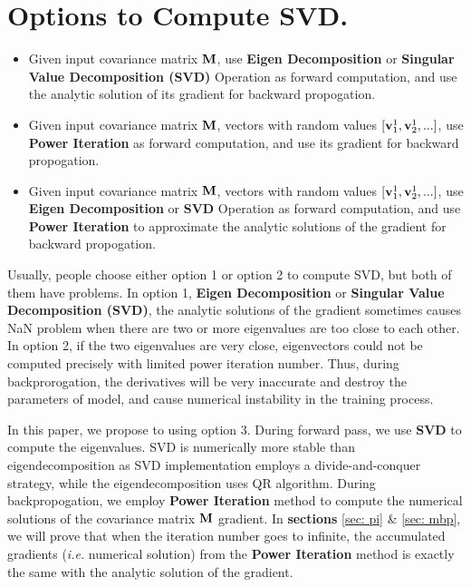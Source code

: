 \section{Options to Compute SVD.}

\begin{itemize}
\item Given input covariance matrix $\mathbf{M}$, use \textbf{Eigen Decomposition} or \textbf{Singular Value Decomposition (SVD)} Operation as forward computation, and use the analytic solution of its gradient for backward propogation.
\item Given input covariance matrix $\mathbf{M}$, vectors with random values $[\mathbf{v}_1^{1}, \mathbf{v}_2^{1}, ...]$, use \textbf{Power Iteration} as forward computation, and use its gradient for backward propogation.
\item Given input covariance matrix $\mathbf{M}$, vectors with random values $[\mathbf{v}_1^{1}, \mathbf{v}_2^{1}, ...]$, use \textbf{Eigen Decomposition} or \textbf{SVD} Operation as forward computation, and use \textbf{Power Iteration} to approximate the analytic solutions of the gradient for backward propogation.
\end{itemize}

Usually, people choose either option 1 or option 2 to compute SVD, but both of them have problems.
In option 1, \textbf{Eigen Decomposition} or \textbf{Singular Value Decomposition (SVD)}, the analytic solutions of the gradient sometimes causes NaN problem when there are two or more eigenvalues are too close to each other.
In option 2, if the two eigenvalues are very close, eigenvectors could not be computed precisely with limited power iteration number. Thus, during backprorogation, the derivatives will be very inaccurate and destroy the parameters of model, and cause numerical instability in the training process.

In this paper, we propose to using option 3. During forward pass, we use \textbf{SVD} to compute the eigenvalues. 
SVD is numerically more stable than eigendecomposition \cite{nakatsukasa2013stable} as SVD implementation employs a divide-and-conquer strategy, while the eigendecomposition uses QR algorithm. 
During backpropogation, we employ \textbf{Power Iteration} method to compute the numerical solutions of the covariance matrix $\mathbf{M}$ gradient.
In \textbf{sections} \ref{sec: pi} \& \ref{sec: mbp}, we will prove that when the iteration number goes to infinite, the accumulated gradients (\emph{i.e.} numerical solution) from the \textbf{Power Iteration} method is exactly the same with the analytic solution of the gradient.

